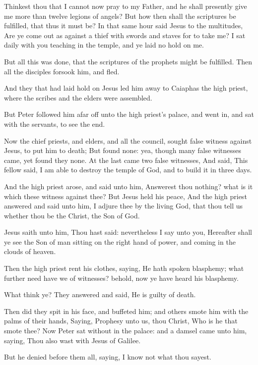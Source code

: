 \verse Thinkest thou that I cannot now pray to my Father, and he shall presently give me more than twelve legions of angels?  \verse But how then shall the scriptures be fulfilled, that thus it must be?  \verse In that same hour said Jesus to the multitudes, Are ye come out as against a thief with swords and staves for to take me? I sat daily with you teaching in the temple, and ye laid no hold on me.

\verse But all this was done, that the scriptures of the prophets might be fulfilled. Then all the disciples forsook him, and fled.

\verse And they that had laid hold on Jesus led him away to Caiaphas the high priest, where the scribes and the elders were assembled.

\verse But Peter followed him afar off unto the high priest's palace, and went in, and sat with the servants, to see the end.

\verse Now the chief priests, and elders, and all the council, sought false witness against Jesus, to put him to death; \verse But found none: yea, though many false witnesses came, yet found they none. At the last came two false witnesses, \verse And said, This fellow said, I am able to destroy the temple of God, and to build it in three days.

\verse And the high priest arose, and said unto him, Answerest thou nothing? what is it which these witness against thee?  \verse But Jesus held his peace, And the high priest answered and said unto him, I adjure thee by the living God, that thou tell us whether thou be the Christ, the Son of God.

\verse Jesus saith unto him, Thou hast said: nevertheless I say unto you, Hereafter shall ye see the Son of man sitting on the right hand of power, and coming in the clouds of heaven.

\verse Then the high priest rent his clothes, saying, He hath spoken blasphemy; what further need have we of witnesses? behold, now ye have heard his blasphemy.

\verse What think ye? They answered and said, He is guilty of death.

\verse Then did they spit in his face, and buffeted him; and others smote him with the palms of their hands, \verse Saying, Prophesy unto us, thou Christ, Who is he that smote thee?  \verse Now Peter sat without in the palace: and a damsel came unto him, saying, Thou also wast with Jesus of Galilee.

\verse But he denied before them all, saying, I know not what thou sayest.

